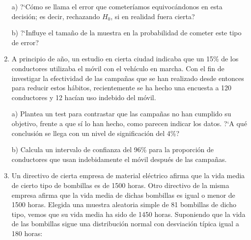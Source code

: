 \begin{adjustwidth}{20pt}{10pt}
\begin{enumerate}[PB. 1. ]
a) ?`Cómo se llama el error que cometeríamos equivocándonos en esta decisión; es decir, rechazando $H_0$, si en realidad fuera cierta? 

b) ?`Influye el tamaño de la muestra en la probabilidad de cometer este tipo de error? 

\hspace{-15mm}

\hspace{-15mm}

\hspace{-15mm} \vspace{1cm}






\item A principio de año, un estudio en cierta ciudad indicaba que un 
15\% de los conductores utilizaba el móvil con el vehículo en marcha.
Con el fin de investigar la efectividad de las campañas que se han 
realizado desde entonces para reducir estos hábitos, recientemente se
ha hecho una encuesta a 120 conductores y 
12 hacían uso indebido del móvil.

a) Plantea un test para contrastar que las campañas no han cumplido su objetivo, frente a que sí lo han hecho, como parecen indicar los datos. ?`A qué conclusión se llega con un nivel de significación del 4\%?

b) Calcula un intervalo de confianza del 96\% para la proporción de conductores que usan indebidamente el móvil después de las campañas.

\hspace{-15mm}\vspace{1cm}

\item Un directivo de cierta empresa de material eléctrico afirma que la vida media de cierto tipo de bombillas es de 1500 horas. Otro directivo de la misma empresa afirma que la vida media de dichas bombillas es igual o menor de 1500 horas. Elegida una muestra aleatoria simple de 81 bombillas de dicho tipo, vemos que su vida media ha sido de 1450 horas. Suponiendo que la vida de las bombillas sigue una distribución normal con desviación típica igual a 180 horas:


\end{enumerate}
\end{adjustwidth}

